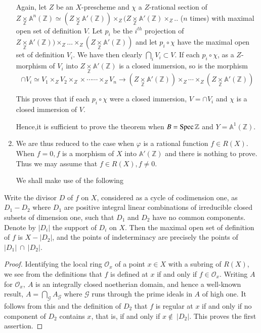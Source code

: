 \begin{enumerate}
Again, let $Z$ be an $X$-prescheme and $\chi$ a $Z$-rational section
of $Z \underset{\mathbb{Z}} \times \mathbb{A}^{n} (\mathbb{Z}) \simeq
(Z \underset{\mathbb{Z}}{\times} \mathbb{A'} (\mathbb{Z})) \times_{Z}
(Z \underset{\mathbb{Z}}{\times}
\mathbb{A'}(\mathbb{Z})\times_{Z}..$ ($n$ times) with maximal open set of
definition $V$. Let $p_{i}$ be the $i^{th}$ projection of $Z
\underset{\mathbb{Z}}{\times} \mathbb{A'}(\mathbb{Z}))\times_{Z}
\ldots \times_{Z} (Z \underset{\mathbb{Z}}{\times}
\mathbb{A'}(\mathbb{Z}))$ and let $p_{i}\circ \chi$ have the maximal
open set of definition $V_{i}$. We have then clearly
$\bigcap\limits_{i} V_{i} \subset V$. If each $p_{i} \circ \chi$, as a
$Z$-morphism of $V_{i}$ into $Z \underset{\mathbb{Z}}{\times}
\mathbb{A'}(\mathbb{Z})$ is a closed immersion, so is the morphism 
$$
\cap V_{i} \simeq V_{1} \times_{Z} V_{2} \times_{Z} \times \cdots
\cdots \times_{Z} V_{n} \to (Z \underset{\mathbb{Z}}{\times}
\mathbb{A'}(\mathbb{Z})) \times_{Z}\cdots \times_{Z}(Z
\underset{\mathbb{Z}}{\times} \mathbb{A'}(\mathbb{Z})) 
$$       

This proves that if each $p_{i} \circ \chi$ were a closed immersion,
$V = \cap V_{i}$ and $\chi$ is a closed immersion of $V$. 

Hence,\pageoriginale it is sufficient to prove the theorem when $B = \operatorname{Spec}
\mathbb{Z}$ and $Y = \mathbb{A}^{1} (\mathbb{Z})$. 

\item We are thus reduced to the case when $\varphi$ is a rational
function $f \in R (X)$. When $f = 0, f$ is a morphism of $X$ into
$\mathbb{A'}(\mathbb{Z})$ and there is nothing to prove. Thus we may
assume that $f \in R(X), f \neq 0$. 

\noindent
We shall make use of the following
\end{enumerate}

\begin{lemma*}%
  Write the divisor $D$ of $f$ on $X$, considered as a cycle of
  codimension one, as $D_{1}-D_{2}$ where $D_{1}$ are positive
  integral linear combinations of irreducible closed subsets of
  dimension one, such that $D_{1}$ and $D_{2}$ have no common
  components. Denote by $|D_{i}|$ the support of $D_{i}$ on $X$. Then
  the maximal open set of definition of $f$ is $X-|D_{2}|$, and the
  points of indeterminacy are precisely the points of $|D_{1}|~ \cap
  ~|D_{2}|$.   
\end{lemma*}

\begin{proof}
  Identifying the local ring $\mathscr{O}_{x}$ of a point $x \in X$
  with a subring of $R(X)$, we see from the definitions that $f$ is
  defined at $x$ if and only if $f \in \mathscr{O}_{x}$. Writing $A$
  for $\mathscr{O}_{x},~ A$ is an integrally closed noetherian domain,
  and hence a well-known result, $A =\bigcap\limits_{\mathscr{G}}
  A_{\mathscr{G}}$ where $\mathscr{G}$ runs through the prime ideals
  in $A$ of high one. It follows from this and the definition of
  $D_{2}$ that $f$ is regular at $x$ if and only if no component of
  $D_{2}$ contains $x$, that is, if and only if $x \notin~
  |D_{2}|$. This proves the first assertion.   
\end{proof}

